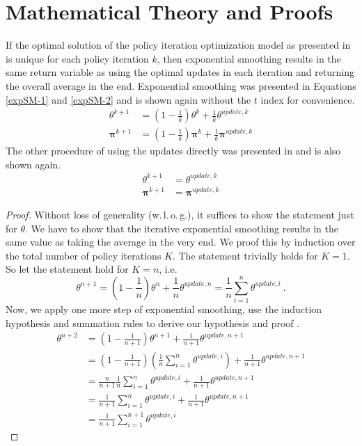 \chapter{Mathematical Theory and Proofs}

\begin{lemma}\label{l-expSmooth}
	If the optimal solution of the policy iteration optimization model as presented in  is unique for each policy iteration $k$, then exponential smoothing results in the same return variable as using the optimal updates in each iteration and returning the overall average in the end. Exponential smoothing was presented in Equations \eqref{expSM-1} and \eqref{expSM-2} and is shown again without the $t$ index for convenience.
	\begin{align}
	\theta^{k+1} &= \left(1- \frac{1}{k} \right)	\theta^k + \frac{1}{k} \theta^{update,k}\\
	\boldsymbol{\pi}^{k+1} &= \left(1- \frac{1}{k} \right)	\boldsymbol{\pi}^k + \frac{1}{k} \boldsymbol{\pi}^{update,k}
	\end{align}
	The other procedure of using the updates directly was presented in  and is also shown again.
	\begin{align}
	\theta^{k+1} &= \theta^{update,k}\\
	\boldsymbol{\pi}^{k+1} &= \boldsymbol{\pi}^{update,k}
	\end{align}
\end{lemma}

\begin{proof}
	Without loss of generality (w.\,l.\,o.\,g.), it suffices to show the statement just for $\theta$. We have to show that the iterative exponential smoothing results in the same value as taking the average in the very end. We proof this by induction over the total number of policy iterations $K$. The statement trivially holds for $K=1$. So let the statement hold for $K=n$, i.e.
	$$\theta^{n+1} = \left(1- \frac{1}{n} \right)	\theta^n + \frac{1}{n} \theta^{update,n} = \frac{1}{n}\sum_{i=1}^{n} \theta^{update,i}~.$$
	Now, we apply one more step of exponential smoothing, use the induction hypothesis and summation rules to derive our hypothesis and proof .
	\begin{align}
	\theta^{n+2} &= \left(1- \frac{1}{n+1} \right)	\theta^{n+1} + \frac{1}{n+1} \theta^{update,n+1}\\
	&= \left(1- \frac{1}{n+1} \right) \left( \frac{1}{n}\sum_{i=1}^{n} \theta^{update,i} \right) + \frac{1}{n+1} \theta^{update,n+1}\\
	&= \frac{n}{n+1}\frac{1}{n}\sum_{i=1}^{n} \theta^{update,i} + \frac{1}{n+1} \theta^{update,n+1}\\
	&= \frac{1}{n+1}\sum_{i=1}^{n} \theta^{update,i} + \frac{1}{n+1} \theta^{update,n+1}\\
	&= \frac{1}{n+1}\sum_{i=1}^{n+1} \theta^{update,i}
	\end{align}
\end{proof}

